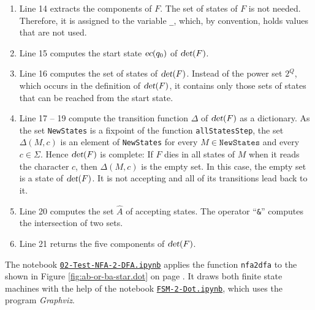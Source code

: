 \begin{enumerate}
      \begin{enumerate}
      \item Line 14 extracts the components of $F$.  The set of states of $F$ is not needed.  Therefore, it is
            assigned to the variable \texttt{\_}, which, by convention, holds values that are not used.
      \item Line 15 computes the start state $\textsl{ec}(q_0)$ of $\textsl{det}(F)$.
      \item Line 16 computes the set of states of $\textsl{det}(F)$.  Instead of the power set $2^Q$, which
            occurs in the definition of $\textsl{det}(F)$, it contains only those sets of states that can be
            reached from the start state.
      \item Line 17 -- 19 compute the transition function $\Delta$ of $\textsl{det}(F)$ as a dictionary.  As the
            set \texttt{NewStates} is a fixpoint of the function \texttt{allStatesStep}, the set
            $\Delta(M, c)$ is an element of \texttt{NewStates} for every $M \in \texttt{NewStates}$ and every
            $c \in \Sigma$.  Hence $\textsl{det}(F)$ is complete:  If $F$ dies in all states of $M$ when it
            reads the character $c$, then $\Delta(M, c)$ is the empty set.  In this case, the empty set is a state
            of $\textsl{det}(F)$.  It is not accepting and all of its transitions lead back to it.
      \item Line 20 computes the set $\widehat{A}$ of accepting states.  The operator ``\texttt{\&}'' computes
            the intersection of two sets.
      \item Line 21 returns the five components of $\textsl{det}(F)$.
      \end{enumerate}
\end{enumerate}
The notebook
\href{https://github.com/karlstroetmann/Formal-Languages/blob/master/Python/Chapter-04-05/02-Test-NFA-2-DFA.ipynb}{\texttt{02-Test-NFA-2-DFA.ipynb}}
applies the function \texttt{nfa2dfa} to the  shown in Figure \ref{fig:ab-or-ba-star.dot} on page
\pageref{fig:ab-or-ba-star.dot}.  It draws both finite state machines with the help of the notebook
\href{https://github.com/karlstroetmann/Formal-Languages/blob/master/Python/Chapter-04-05/FSM-2-Dot.ipynb}{\texttt{FSM-2-Dot.ipynb}},
which uses the program \textsl{Graphviz}.



